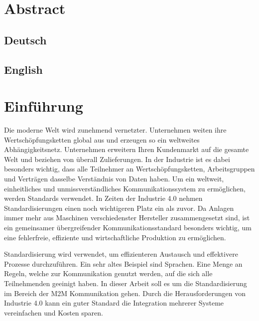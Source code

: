 \documentclass[a4paper, 12pt, oneside, toc=listofnumbered, bibliography=totoc]{scrbook}
\begin{document}
	\frontmatter
	
	
	\tableofcontents
	\listoffigures
	\nocite{*}

	
	
	\chapter*{Abstract}
	
	\section*{Deutsch}
	
	\section*{English}
	
	
	\mainmatter
	\pagebreak
	\chapter{Einführung}\label{ch:Einführung}
	
	Die moderne Welt wird zunehmend vernetzter. Unternehmen weiten ihre Wertschöpfungsketten global aus und erzeugen so ein weltweites Abhängigkeitsnetz. Unternehmen erweitern Ihren Kundenmarkt auf die gesamte Welt und beziehen von überall Zulieferungen. In der Industrie ist es dabei besonders wichtig, dass alle Teilnehmer an Wertschöpfungsketten, Arbeitsgruppen und Verträgen dasselbe Verständnis von Daten haben. Um ein weltweit, einheitliches und unmissverständliches Kommunikationssystem zu ermöglichen, werden Standards verwendet. In Zeiten der Industrie 4.0 nehmen Standardisierungen einen noch wichtigeren Platz ein als zuvor. Da Anlagen immer mehr aus Maschinen verschiedenster Hersteller zusammengesetzt sind, ist ein gemeinsamer übergreifender Kommunikationsstandard besonders wichtig, um eine fehlerfreie, effiziente und wirtschaftliche Produktion zu ermöglichen.
	
	Standardisierung wird verwendet, um effizienteren Austausch und effektivere Prozesse durchzuführen. Ein sehr altes Beispiel sind Sprachen. Eine Menge an Regeln, welche zur Kommunikation genutzt werden, auf die sich alle Teilnehmenden geeinigt haben. In dieser Arbeit soll es um die Standardisierung im Bereich der \ac{M2M} Kommunikation gehen. Durch die Herausforderungen von Industrie 4.0 kann ein guter Standard die Integration mehrerer Systeme vereinfachen und Kosten sparen.
	
\end{document}
